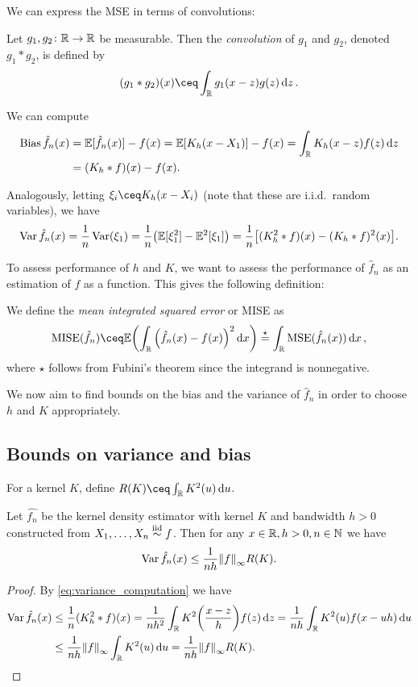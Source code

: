 We can express the MSE in terms of convolutions: 
\begin{definition}
	Let $g_1, g_2 \colon \mathbb R \to \mathbb R$ be measurable. Then the \emph{convolution} of $g_1$ and $g_2$, denoted $g_1 * g_2$, is defined by
	\[
	(g_1 * g_2)(x) \ceq \int_\RR g_1(x - z) g(z) \dd{z}. 
	\]
\end{definition}
We can compute 
\begin{align*}
\operatorname{Bias} \hat f_n(x) &= \mathbb E[\hat f_n(x)] - f(x) = \mathbb E[K_h(x - X_1)] - f(x) = \int_\mathbb R  K_h(x - z) f(z) \dd{z} \\
&= (K_h * f)(x) - f(x). 
\end{align*}

Analogously, letting $\xi_i \ceq K_h(x - X_i)$ (note that these are i.i.d.\ random variables), we have
\begin{equation} \label{eq:variance_computation}
	\operatorname{Var} \hat f_n(x) = \frac1n \operatorname{Var}(\xi_1) = \frac1n \qty(\mathbb E[\xi_1^2] - \mathbb E^2[\xi_1]) = \frac1n \qty[(K_h^2 * f)(x) - (K_h * f)^2(x)].
\end{equation}

To assess performance of $h$ and $K$, we want to assess the performance of $\hat f_n$ as an estimation of $f$ as a function. This gives the following definition:
\begin{definition}
	We define the \emph{mean integrated squared error} or MISE as\[
	\MISE(\hat f_n) \ceq \EE\qty(\int_\RR \qty(\hat f_n(x) - f(x))^2 \dd{x}) \overset\star= \int_\RR \MSE(\hat f_n(x)) \dd{x}, 
	\]
	where $\star$ follows from Fubini's theorem since the integrand is nonnegative. 
\end{definition}

We now aim to find bounds on the bias and the variance of $\hat f_n$ in order to choose $h$ and $K$ appropriately.

\subsection{Bounds on variance and bias}
\begin{definition}
	For a kernel $K$, define $R(K) \ceq \int_\RR K^2(u) \dd{u}$. 
\end{definition}

\begin{proposition}
	Let $\hat{f_n}$ be the kernel density estimator with kernel $K$ and bandwidth $h > 0$ constructed from $X_1, \dotsc, X_n \overset{\mathrm{iid}}{\sim} f$. Then for any $x \in \mathbb R, h > 0, n \in \mathbb N$ we have
	\[
	\operatorname{Var} \hat f_n(x) \leq \frac{1}{nh} \norm{f}_\infty R(K). 
	\]
\end{proposition}

\begin{proof}
	By \cref{eq:variance_computation} we have
	\begin{align*}
	\operatorname{Var} \hat f_n(x) &\leq \frac1n (K_h^2 * f)(x) = \frac{1}{nh^2} \int_\mathbb R K^2\qty(\frac{x - z}{h}) f(z) \dd{z} = \frac{1}{nh} \int_\mathbb R K^2(u) f(x - uh) \dd{u} \\
	&\leq \frac1{nh} \norm{f}_\infty \int_\mathbb R K^2(u) \dd{u} = \frac{1}{nh} \norm{f}_\infty R(K). 
	\end{align*}
\end{proof}